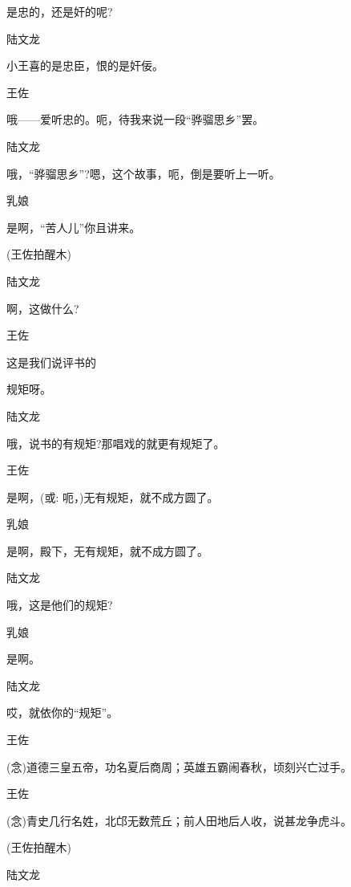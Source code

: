 {{{是忠的，还是奸的呢?}

{陆文龙\hspace{20pt}~

小王喜的是忠臣，恨的是奸佞。}

{王佐\hspace{30pt}~

哦------爱听忠的。呃，待我来说一段``骅骝思乡''罢。}

{陆文龙\hspace{20pt}~

哦，``骅骝思乡''?嗯，这个故事，呃，倒是要听上一听。}

{乳娘\hspace{30pt}~

是啊，``苦人儿''你且讲来。}

{(王佐拍醒木)}

{陆文龙\hspace{20pt}~

啊，这做什么?}

{王佐\hspace{30pt}~

这是我们说评书的}规矩呀。

陆文龙\hspace{20pt}~

哦，说书的有规矩?那唱戏的就更有规矩了。

{王佐\hspace{30pt}~

是啊，({\akai 或}: 呃，)无有规矩，就不成方圆了。}

{乳娘\hspace{30pt}~

是啊，殿下，无有规矩，就不成方圆了。}

{陆文龙\hspace{20pt}~

哦，这是他们的规矩?}

{乳娘\hspace{30pt}~

是啊。}

{陆文龙\hspace{20pt}~

哎，就依你的``规矩''。}

{王佐

({\akai 念})道德三皇五帝，功名夏后商周；英雄五霸闹春秋，顷刻兴亡过手。}

{王佐

({\akai 念})青史几行名姓，北邙无数荒丘；前人田地后人收，说甚龙争虎斗。}

{(王佐拍醒木)}

{陆文龙\hspace{20pt}~

}}}
